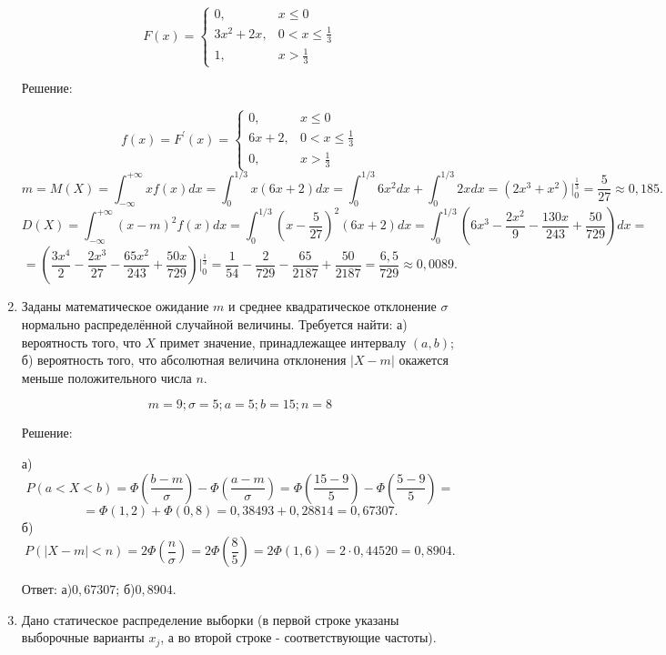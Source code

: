 \documentclass{article}
\renewcommand{\le}{\ensuremath{\leqslant}}
\begin{document}
\begin{enumerate}
\begin{equation*}
F(x) =
 \begin{cases}
  0, & x\le0\\
  3x^2+2x, & 0<x\le\frac{1}{3}\\
  1, & x>\frac{1}{3}
 \end{cases}
\end{equation*}
\begin{center}Решение:\end{center}
\begin{equation*}
f(x) = F^{\prime}(x) =
 \begin{cases}
  0, & x\le0\\
  6x+2, & 0<x\le\frac{1}{3}\\
  0, & x>\frac{1}{3}
 \end{cases}
\end{equation*}
$$m=M(X)=\int_{-\infty}^{+\infty} x f(x) dx=\int_{0}^{1/3} x(6x+2) dx=\int_{0}^{1/3} 6x^2dx + \int_{0}^{1/3} 2xdx=(2x^3+x^2)\bigg|_{0}^{\frac{1}{3}}=\frac{5}{27}\approx0,185.$$
$$D(X)=\int_{-\infty}^{+\infty} (x-m)^2 f(x) dx=\int_{0}^{1/3} \left(x-\frac{5}{27}\right)^2(6x+2) dx=\int_{0}^{1/3} \left(6x^3-\frac{2x^2}{9}-\frac{130x}{243}+\frac{50}{729}\right) dx=$$
$$=\left(\frac{3x^4}{2}-\frac{2x^3}{27}-\frac{65x^2}{243}+\frac{50x}{729}\right)\bigg|_{0}^{\frac{1}{3}}=\frac{1}{54}-\frac{2}{729}-\frac{65}{2187}+\frac{50}{2187}=\frac{6,5}{729}\approx0,0089.$$

\item %
Заданы математическое ожидание $m$ и среднее квадратическое отклонение $\sigma$ нормально распределённой случайной величины. \newline
Требуется найти: а) вероятность того, что $X$ примет значение, принадлежащее интервалу $(a, b)$; \newline
б) вероятность того, что абсолютная величина отклонения $|X-m|$ окажется меньше положительного числа $n$.

$$m=9;\sigma=5;a=5;b=15;n=8$$
\begin{center}Решение:\end{center}
а) $$P(a<X<b)=\Phi\left(\frac{b-m}{\sigma}\right)-\Phi\left(\frac{a-m}{\sigma}\right)=\Phi\left(\frac{15-9}{5}\right)-\Phi\left(\frac{5-9}{5}\right)=$$
$$=\Phi(1,2)+\Phi(0,8)=0,38493+0,28814=0,67307.$$
б)
$$P (|X-m| < n)= 2\Phi\left(\frac{n}{\sigma}\right)=2\Phi\left(\frac{8}{5}\right)=2\Phi(1,6)=2\cdot0,44520=0,8904.$$

Ответ: а)$0,67307$; б)$0,8904$.

\item %
Дано статическое распределение выборки (в первой строке указаны выборочные варианты $x_j$, а во второй строке - соответствующие частоты).


\end{enumerate}
\end{document}
